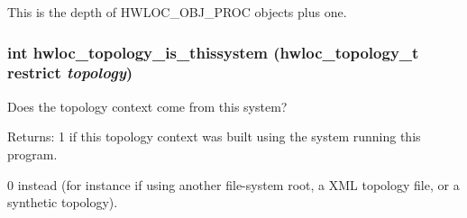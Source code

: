 This is the depth of HWLOC\_\-OBJ\_\-PROC objects plus one. \hypertarget{group__hwlocality__information_g29cdfde981aafc92eb89639a36b1ff9b}{
\subsubsection[{hwloc\_\-topology\_\-is\_\-thissystem}]{\setlength{\rightskip}{0pt plus 5cm}int hwloc\_\-topology\_\-is\_\-thissystem ({\bf hwloc\_\-topology\_\-t} restrict {\em topology})}}
\label{group__hwlocality__information_g29cdfde981aafc92eb89639a36b1ff9b}


Does the topology context come from this system? 

\begin{Desc}
\item[Returns:]1 if this topology context was built using the system running this program. 

0 instead (for instance if using another file-system root, a XML topology file, or a synthetic topology). \end{Desc}
